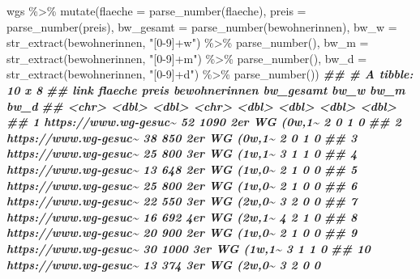 \documentclass[
  ngerman,
]{article}
\newenvironment{Shaded}{\begin{snugshade}}{\end{snugshade}}
\newcommand{\AttributeTok}[1]{\textcolor[rgb]{0.77,0.63,0.00}{#1}}
\newcommand{\DocumentationTok}[1]{\textcolor[rgb]{0.56,0.35,0.01}{\textbf{\textit{#1}}}}
\newcommand{\FunctionTok}[1]{\textcolor[rgb]{0.00,0.00,0.00}{#1}}
\newcommand{\NormalTok}[1]{#1}
\newcommand{\SpecialCharTok}[1]{\textcolor[rgb]{0.00,0.00,0.00}{#1}}
\newcommand{\StringTok}[1]{\textcolor[rgb]{0.31,0.60,0.02}{#1}}
\begin{document}
\begin{Shaded}
\begin{Highlighting}[]
\NormalTok{wgs }\SpecialCharTok{\%\textgreater{}\%}
  \FunctionTok{mutate}\NormalTok{(}\AttributeTok{flaeche =} \FunctionTok{parse\_number}\NormalTok{(flaeche),}
         \AttributeTok{preis =} \FunctionTok{parse\_number}\NormalTok{(preis),}
         \AttributeTok{bw\_gesamt =} \FunctionTok{parse\_number}\NormalTok{(bewohnerinnen),}
         \AttributeTok{bw\_w =} \FunctionTok{str\_extract}\NormalTok{(bewohnerinnen, }\StringTok{"[0{-}9]+w"}\NormalTok{) }\SpecialCharTok{\%\textgreater{}\%} \FunctionTok{parse\_number}\NormalTok{(),}
         \AttributeTok{bw\_m =} \FunctionTok{str\_extract}\NormalTok{(bewohnerinnen, }\StringTok{"[0{-}9]+m"}\NormalTok{) }\SpecialCharTok{\%\textgreater{}\%} \FunctionTok{parse\_number}\NormalTok{(),}
         \AttributeTok{bw\_d =} \FunctionTok{str\_extract}\NormalTok{(bewohnerinnen, }\StringTok{"[0{-}9]+d"}\NormalTok{) }\SpecialCharTok{\%\textgreater{}\%} \FunctionTok{parse\_number}\NormalTok{())}
\DocumentationTok{\#\# \# A tibble: 10 x 8}
\DocumentationTok{\#\#    link                  flaeche preis bewohnerinnen bw\_gesamt  bw\_w  bw\_m  bw\_d}
\DocumentationTok{\#\#    \textless{}chr\textgreater{}                   \textless{}dbl\textgreater{} \textless{}dbl\textgreater{} \textless{}chr\textgreater{}             \textless{}dbl\textgreater{} \textless{}dbl\textgreater{} \textless{}dbl\textgreater{} \textless{}dbl\textgreater{}}
\DocumentationTok{\#\#  1 https://www.wg{-}gesuc\textasciitilde{}      52  1090 2er WG (0w,1\textasciitilde{}         2     0     1     0}
\DocumentationTok{\#\#  2 https://www.wg{-}gesuc\textasciitilde{}      38   850 2er WG (0w,1\textasciitilde{}         2     0     1     0}
\DocumentationTok{\#\#  3 https://www.wg{-}gesuc\textasciitilde{}      25   800 3er WG (1w,1\textasciitilde{}         3     1     1     0}
\DocumentationTok{\#\#  4 https://www.wg{-}gesuc\textasciitilde{}      13   648 2er WG (1w,0\textasciitilde{}         2     1     0     0}
\DocumentationTok{\#\#  5 https://www.wg{-}gesuc\textasciitilde{}      25   800 2er WG (1w,0\textasciitilde{}         2     1     0     0}
\DocumentationTok{\#\#  6 https://www.wg{-}gesuc\textasciitilde{}      22   550 3er WG (2w,0\textasciitilde{}         3     2     0     0}
\DocumentationTok{\#\#  7 https://www.wg{-}gesuc\textasciitilde{}      16   692 4er WG (2w,1\textasciitilde{}         4     2     1     0}
\DocumentationTok{\#\#  8 https://www.wg{-}gesuc\textasciitilde{}      20   900 2er WG (1w,0\textasciitilde{}         2     1     0     0}
\DocumentationTok{\#\#  9 https://www.wg{-}gesuc\textasciitilde{}      30  1000 3er WG (1w,1\textasciitilde{}         3     1     1     0}
\DocumentationTok{\#\# 10 https://www.wg{-}gesuc\textasciitilde{}      13   374 3er WG (2w,0\textasciitilde{}         3     2     0     0}
\end{Highlighting}
\end{Shaded}
\end{document}
